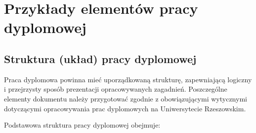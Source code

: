 \chapter{Przykłady elementów pracy dyplomowej}
\label{cha:elementyPracy}

\section{Struktura (układ) pracy dyplomowej}

Praca dyplomowa powinna mieć uporządkowaną strukturę, zapewniającą logiczny i przejrzysty sposób prezentacji opracowywanych zagadnień. Poszczególne elementy dokumentu należy przygotować zgodnie z obowiązującymi wytycznymi dotyczącymi opracowywania prac dyplomowych na Uniwersytecie Rzeszowskim.

Podstawowa struktura pracy dyplomowej obejmuje:


